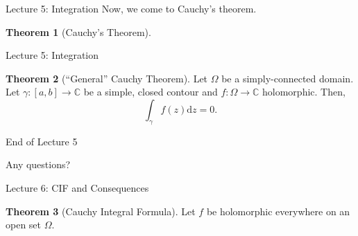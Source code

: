 \documentclass[handout, dvipsnames]{beamer}
\theoremstyle{definition}
\newtheorem{thm}{Theorem}
\begin{document}
\begin{frame}{Lecture 5: Integration}
    Now, we come to Cauchy's theorem.
    \begin{thm}[Cauchy's Theorem]
    \end{thm}
\end{frame}
\begin{frame}{Lecture 5: Integration}
    \begin{thm}[``General'' Cauchy Theorem]
        Let $\Omega$ be a simply-connected domain. Let $\gamma:[a, b] \to \mathbb{C}$ be a simple, closed contour and $f:\Omega\to\mathbb{C}$ holomorphic. Then,
        \begin{equation*} 
            \int_{\gamma}^{} f(z) {\mathrm{d}}z = 0.
        \end{equation*}
    \end{thm}
\end{frame}
\begin{frame}{End of Lecture 5}
    \begin{tcolorbox}
        Any questions?
    \end{tcolorbox}
\end{frame}
\begin{frame}{Lecture 6: CIF and Consequences}
    \begin{thm}[Cauchy Integral Formula]
        Let $f$ be holomorphic everywhere on an open set $\Omega.$ 
    \end{thm}
\end{frame}
\end{document}
